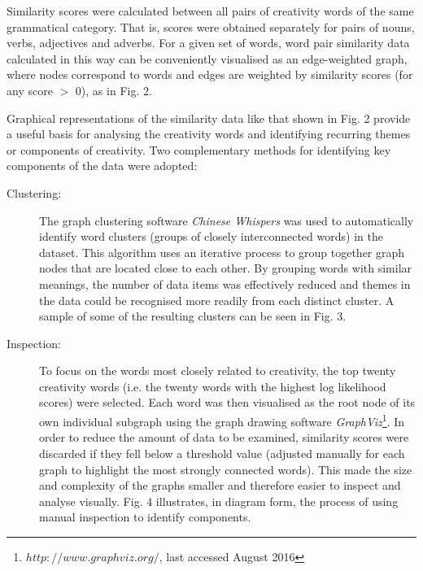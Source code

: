 \documentclass[10pt,letterpaper]{article}
\begin{document}
Similarity scores were calculated between all pairs of creativity words of the same grammatical category. That is, scores were obtained separately for pairs of nouns, verbs, adjectives and adverbs. For a given set of words, word pair similarity data calculated in this way can be conveniently visualised as an edge-weighted graph, where nodes  correspond to words and edges are weighted by similarity scores (for any score $>$ 0), as in Fig. 2. %

  

Graphical representations of the similarity data like that shown in Fig. 2 %
provide a useful basis for analysing the creativity words and identifying recurring themes or components of creativity. Two complementary methods for identifying key components of the data were adopted:






\begin{description}

\item[Clustering:] The graph clustering software {\em Chinese Whispers} \cite{biemann06} was used to automatically identify word clusters (groups of closely interconnected words) in the dataset. This algorithm uses an iterative process to group together graph nodes that are located close to each other. By grouping words with similar meanings, the number of data items was effectively reduced and themes in the data could be recognised more readily from each distinct cluster. A sample of some of the resulting clusters can be seen in Fig. 3. %

\item[Inspection:] To focus on the words most closely related to creativity, the top twenty creativity words (i.e. the twenty  words with the highest log likelihood scores) were selected. Each word was then visualised as the root node of its own individual subgraph using the graph drawing software {\em GraphViz}\footnote{$http://www.graphviz.org/$, last accessed August 2016}. In order to reduce the amount of data to be examined, similarity scores were discarded if they fell below a threshold value (adjusted manually for each graph to highlight the most strongly connected words). This made the size and complexity of the graphs smaller and therefore easier to inspect and analyse visually. Fig. 4 %
illustrates, in diagram form, the process of using manual inspection to identify components. 

\end{description}
\end{document}
